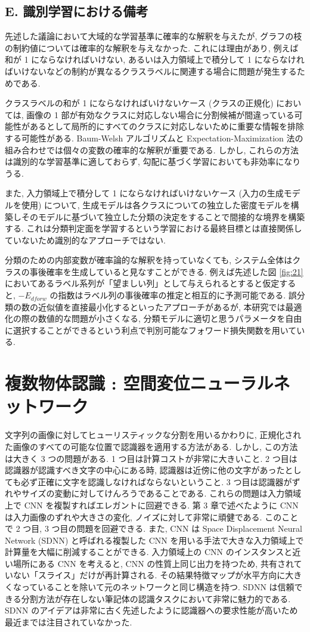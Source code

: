 \documentclass[twocolumn]{jarticle}     %
\begin{document}
\subsection*{E. 識別学習における備考}
先述した議論において大域的な学習基準に確率的な解釈を与えたが, グラフの枝の制約値については確率的な解釈を与えなかった. これには理由があり, 例えば和が 1 にならなければいけない, あるいは入力領域上で積分して 1 にならなければいけないなどの制約が異なるクラスラベルに関連する場合に問題が発生するためである.\par
クラスラベルの和が 1 にならなければいけないケース (クラスの正規化) においては, 画像の 1 部が有効なクラスに対応しない場合に分割候補が間違っている可能性があるとして局所的にすべてのクラスに対応しないために重要な情報を排除する可能性がある. Baum-Welsh アルゴリズムと Expectation-Maximization 法の組み合わせでは個々の変数の確率的な解釈が重要である. しかし, これらの方法は識別的な学習基準に適しておらず, 勾配に基づく学習においても非効率になりうる.\par
また, 入力領域上で積分して 1 にならなければいけないケース (入力の生成モデルを使用) について, 生成モデルは各クラスについての独立した密度モデルを構築しそのモデルに基づいて独立した分類の決定をすることで間接的な境界を構築する. これは分類判定面を学習するという学習における最終目標とは直接関係していないため識別的なアプローチではない. 
\par
分類のための内部変数が確率論的な解釈を持っていなくても, システム全体はクラスの事後確率を生成していると見なすことができる. 例えば先述した図 \ref{fig:21} においてあるラベル系列が「望ましい列」として与えられるとすると仮定すると, $-E_{dforw}$ の指数はラベル列の事後確率の推定と相互的に予測可能である. 
誤分類の数の近似値を直接最小化するといったアプローチがあるが, 本研究では最適化の際の数値的な問題が小さくなる, 分類モデルに適切と思うパラメータを自由に選択することができるという利点で判別可能なフォワード損失関数を用いている.

\section{複数物体認識 : 空間変位ニューラルネットワーク}
文字列の画像に対してヒューリスティックな分割を用いるかわりに, 正規化された画像のすべての可能な位置で認識器を適用する方法がある. 
しかし, この方法は大きく 3 つの問題がある. 1 つ目は計算コストが非常に大きいこと. 2 つ目は認識器が認識すべき文字の中心にある時, 認識器は近傍に他の文字があったとしても必ず正確に文字を認識しなければならないということ. 3 つ目は認識器がずれやサイズの変動に対してけんろうであることである. これらの問題は入力領域上で CNN を複製すればエレガントに回避できる. 第 3 章で述べたように CNN は入力画像のずれや大きさの変化, ノイズに対して非常に頑健である. このことで 2 つ目, 3 つ目の問題を回避できる. また, CNN は Space Displacement Neural Network (SDNN) と呼ばれる複製した CNN を用いる手法で大きな入力領域上で計算量を大幅に削減することができる. 入力領域上の CNN のインスタンスと近い場所にある CNN を考えると, CNN の性質上同じ出力を持つため, 共有されていない「スライス」だけが再計算される. その結果特徴マップが水平方向に大きくなっていることを除いて元のネットワークと同じ構造を持つ. 
SDNN は信頼できる分割方法が存在しない筆記体の認識タスクにおいて非常に魅力的である. SDNN のアイデアは非常に古く先述したように認識器への要求性能が高いため最近までは注目されていなかった. 
\end{document}
